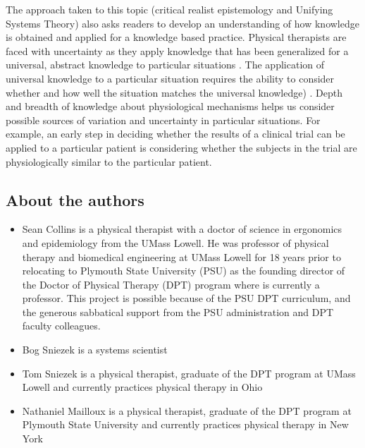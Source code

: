  The approach taken to this topic (critical realist epistemology and Unifying Systems Theory) also asks readers to develop an understanding of how knowledge is obtained and applied for a knowledge based practice. Physical therapists are faced with uncertainty as they apply knowledge that has been generalized for a universal, abstract knowledge to particular situations \cite{collins_complex_2005}. The application of universal knowledge to a particular situation requires the ability to consider whether and how well the situation matches the universal knowledge) \cite{collins_synthesis_2018, collins_particulars_2018}. Depth and breadth of knowledge about physiological mechanisms helps us consider possible sources of variation and uncertainty in particular situations. For example, an early step in deciding whether the results of a clinical trial can be applied to a particular patient is considering whether the subjects in the trial are physiologically similar to the particular patient.


\subsection*{About the authors}

\begin{itemize}
\item Sean Collins is a physical therapist with a doctor of science in ergonomics and epidemiology from the UMass Lowell. He was professor of physical therapy and biomedical engineering at UMass Lowell for 18 years prior to relocating to Plymouth State University (PSU) as the founding director of the Doctor of Physical Therapy (DPT) program where is currently a professor. This project is possible because of the PSU DPT curriculum, and the generous sabbatical support from the PSU administration and DPT faculty colleagues.
\item Bog Sniezek is a systems scientist
\item Tom Sniezek is a physical therapist, graduate of the DPT program at UMass Lowell and currently practices physical therapy in Ohio
\item Nathaniel Mailloux is a physical therapist, graduate of the DPT program at Plymouth State University and currently practices physical therapy in New York
\end{itemize}

\printbibliography[heading=subbibintoc]



